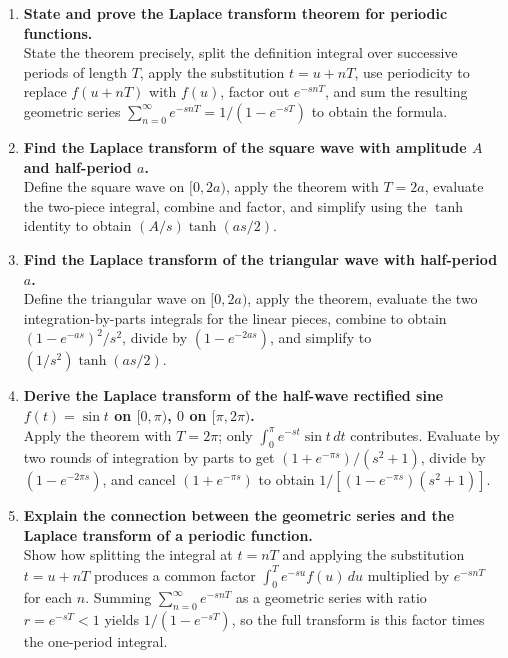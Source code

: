 \documentclass[12pt,a4paper]{article}
\begin{document}
\begin{enumerate}[label=\textbf{\arabic*.}, leftmargin=*, itemsep=10pt]

\item \textbf{State and prove the Laplace transform theorem for periodic
              functions.} \\
State the theorem precisely, split the definition integral over successive
periods of length $T$, apply the substitution $t = u + nT$, use periodicity
to replace $f(u+nT)$ with $f(u)$, factor out $e^{-snT}$, and sum the
resulting geometric series $\sum_{n=0}^\infty e^{-snT} = 1/(1-e^{-sT})$
to obtain the formula.

\item \textbf{Find the Laplace transform of the square wave with amplitude
              $A$ and half-period $a$.} \\
Define the square wave on $[0,2a)$, apply the theorem with $T=2a$, evaluate
the two-piece integral, combine and factor, and simplify using the $\tanh$
identity to obtain $(A/s)\tanh(as/2)$.

\item \textbf{Find the Laplace transform of the triangular wave with
              half-period $a$.} \\
Define the triangular wave on $[0,2a)$, apply the theorem, evaluate the
two integration-by-parts integrals for the linear pieces, combine to obtain
$(1-e^{-as})^2/s^2$, divide by $(1-e^{-2as})$, and simplify to
$(1/s^2)\tanh(as/2)$.

\item \textbf{Derive the Laplace transform of the half-wave rectified sine
              $f(t) = \sin t$ on $[0,\pi)$, $0$ on $[\pi,2\pi)$.} \\
Apply the theorem with $T=2\pi$; only $\int_0^\pi e^{-st}\sin t\,dt$
contributes.  Evaluate by two rounds of integration by parts to get
$(1+e^{-\pi s})/(s^2+1)$, divide by $(1-e^{-2\pi s})$, and cancel
$(1+e^{-\pi s})$ to obtain $1/[(1-e^{-\pi s})(s^2+1)]$.

\item \textbf{Explain the connection between the geometric series and the
              Laplace transform of a periodic function.} \\
Show how splitting the integral at $t=nT$ and applying the substitution
$t=u+nT$ produces a common factor $\int_0^T e^{-su}f(u)\,du$ multiplied by
$e^{-snT}$ for each $n$.  Summing $\sum_{n=0}^\infty e^{-snT}$ as a
geometric series with ratio $r = e^{-sT} < 1$ yields $1/(1-e^{-sT})$, so
the full transform is this factor times the one-period integral.

\end{enumerate}
\end{document}
